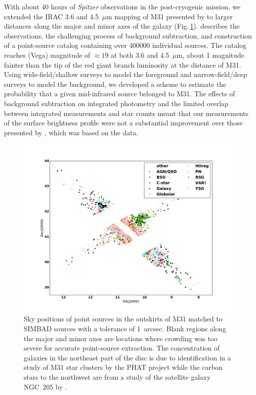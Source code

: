 \documentclass{iau}
\begin{document}
With about 40 hours of {\it Spitzer} observations in the post-cryogenic mission, we extended the IRAC 3.6 and 4.5~$\mu$m
mapping of M31 presented by \cite[Barmby \etal\ (2006)]{barmby06} to larger distances along the major and minor
axes of the galaxy (Fig.\,\ref{fig1}). \cite[Rafiei Ravandi \etal\ (2016)]{rr16} describes the observations, the challenging process of background
subtraction, and construction of a point-source catalog containing over 400000 individual sources. The catalog reaches (Vega)
magnitude of $\approx 19$ at both 3.6 and 4.5~$\mu$m, about 1 magnitude fainter than the tip of the red giant branch luminosity
at the distance of M31. Using wide-field/shallow surveys
to model the foreground and narrow-field/deep surveys to model the background, we developed a scheme to estimate the probability that 
a given mid-infrared source belonged to M31.
The effects of background subtraction on integrated photometry and the limited overlap between integrated measurements
and star counts meant that our measurements of the surface brightness profile  were not a substantial improvement over those presented by
\cite[Courteau \etal\ (2011)]{courteau11}, which was based on the \cite[Barmby \etal\ (2006)]{barmby06} data.


\begin{figure}[t]
\begin{center}
 \includegraphics[width=5in]{barmby_iaus321_fig1} 
 \caption{Sky positions of point sources in the outskirts of M31 matched to SIMBAD sources with a tolerance of 1~arcsec. 
 Blank regions along the major and minor axes are locations where crowding was too severe for accurate point-source extraction.
The concentration of galaxies in the northeast part of the disc is due to identification in a study of M31 star clusters by the PHAT project 
\cite[(Johnson \etal\ 2012)]{johnson12} 
while the carbon stars to the northwest are from a study of the satellite galaxy NGC~205 by \cite[Demers, Battinelli \& Letarte (2003)]{dbl03}.}
   \label{fig1}
\end{center}
\end{figure}
\end{document}
